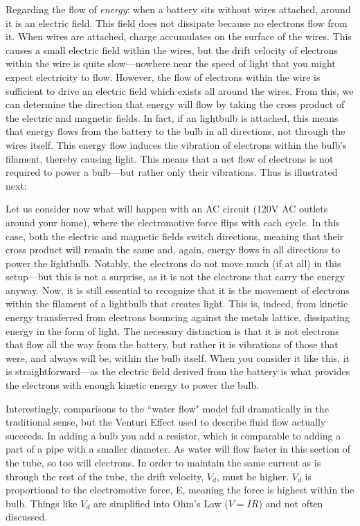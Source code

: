 Regarding the flow of \textit{energy}: when a battery sits without wires attached, around it is an electric field. This field does not dissipate because no electrons flow from it. When wires are attached, charge accumulates on the surface of the wires. This causes a small electric field within the wires, but the drift velocity of electrons within the wire is quite slow---nowhere near the speed of light that you might expect electricity to flow. However, the flow of electrons within the wire is sufficient to drive an electric field which exists all around the wires. From this, we can determine the direction that energy will flow by taking the cross product of the electric and magnetic fields. In fact, if an lightbulb is attached, this means that energy flows from the battery to the bulb in all directions, not through the wires itself. This energy flow induces the vibration of electrons within the bulb's filament, thereby causing light. This means that a net flow of electrons is not required to power a bulb---but rather only their vibrations. Thus is illustrated next:\newline 

Let us consider now what will happen with an AC circuit (120V AC outlets around your home), where the electromotive force flips with each cycle. In this case, both the electric and magnetic fields switch directions, meaning that their cross product will remain the same and, again, energy flows in all directions to power the lightbulb. Notably, the electrons do not move much (if at all) in this setup---but this is not a surprise, as it is not the electrons that carry the energy anyway. Now, it is still essential to recognize that it is the movement of electrons within the filament of a lightbulb that creates light. This is, indeed, from kinetic energy transferred from electrons bouncing against the metals lattice, dissipating energy in the form of light. The necessary distinction is that it is not electrons that flow all the way from the battery, but rather it is vibrations of those that were, and always will be, within the bulb itself. When you consider it like this, it is straightforward---as the electric field derived from the battery is what provides the electrons with enough kinetic energy to power the bulb.\newline

Interestingly, comparisons to the ``water flow" model fail dramatically in the traditional sense, but the Venturi Effect used to describe fluid flow actually succeeds. In adding a bulb you add a resistor, which is comparable to adding a part of a pipe with a smaller diameter. As water will flow faster in this section of the tube, so too will electrons. In order to maintain the same current as is through the rest of the tube, the drift velocity, $V_d$, must be higher. $V_d$ is proportional to the electromotive force, E, meaning the force is highest within the bulb. Things like $V_d$ are simplified into Ohm's Law ($V = IR$) and not often discussed.\newline 

